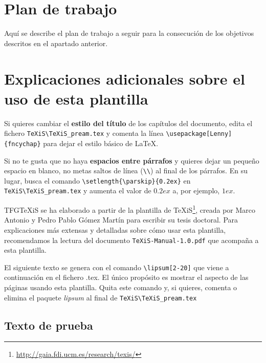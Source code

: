 \section{Plan de trabajo}
Aquí se describe el plan de trabajo a seguir para la consecución de los objetivos descritos en el apartado anterior.



\section{Explicaciones adicionales sobre el uso de esta plantilla}
Si quieres cambiar el \textbf{estilo del título} de los capítulos del documento, edita el fichero \verb|TeXiS\TeXiS_pream.tex| y comenta la línea \verb|\usepackage[Lenny]{fncychap}| para dejar el estilo básico de \LaTeX.

Si no te gusta que no haya \textbf{espacios entre párrafos} y quieres dejar un pequeño espacio en blanco, no metas saltos de línea (\verb|\\|) al final de los párrafos. En su lugar, busca el comando  \verb|\setlength{\parskip}{0.2ex}| en \verb|TeXiS\TeXiS_pream.tex| y aumenta el valor de $0.2ex$ a, por ejemplo, $1ex$.

TFGTeXiS se ha elaborado a partir de la plantilla de TeXiS\footnote{\url{http://gaia.fdi.ucm.es/research/texis/}}, creada por Marco Antonio y Pedro Pablo Gómez Martín para escribir su tesis doctoral. Para explicaciones más extensas y detalladas sobre cómo usar esta plantilla, recomendamos la lectura del documento \texttt{TeXiS-Manual-1.0.pdf} que acompaña a esta plantilla.

El siguiente texto se genera con el comando \verb|\lipsum[2-20]| que viene a continuación en el fichero .tex. El único propósito es mostrar el aspecto de las páginas usando esta plantilla. Quita este comando y, si quieres, comenta o elimina el paquete \textit{lipsum} al final de \verb|TeXiS\TeXiS_pream.tex|

\subsection{Texto de prueba}


\lipsum[2-20]